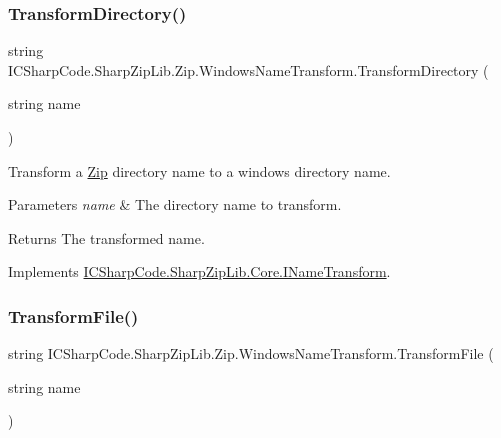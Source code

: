 \subsubsection{\texorpdfstring{Transform\+Directory()}{TransformDirectory()}}
{\footnotesize\ttfamily string I\+C\+Sharp\+Code.\+Sharp\+Zip\+Lib.\+Zip.\+Windows\+Name\+Transform.\+Transform\+Directory (\begin{DoxyParamCaption}\item[{string}]{name }\end{DoxyParamCaption})\hspace{0.3cm}{\ttfamily [inline]}}



Transform a \hyperlink{namespace_i_c_sharp_code_1_1_sharp_zip_lib_1_1_zip}{Zip} directory name to a windows directory name. 


\begin{DoxyParams}{Parameters}
{\em name} & The directory name to transform.\\
\hline
\end{DoxyParams}
\begin{DoxyReturn}{Returns}
The transformed name.
\end{DoxyReturn}


Implements \hyperlink{interface_i_c_sharp_code_1_1_sharp_zip_lib_1_1_core_1_1_i_name_transform_a8052780160a8d458799e014aa8308c78}{I\+C\+Sharp\+Code.\+Sharp\+Zip\+Lib.\+Core.\+I\+Name\+Transform}.

\mbox{\label{class_i_c_sharp_code_1_1_sharp_zip_lib_1_1_zip_1_1_windows_name_transform_aab54d8254c71fcc7b07551a60551e11a}} 
\subsubsection{\texorpdfstring{Transform\+File()}{TransformFile()}}
{\footnotesize\ttfamily string I\+C\+Sharp\+Code.\+Sharp\+Zip\+Lib.\+Zip.\+Windows\+Name\+Transform.\+Transform\+File (\begin{DoxyParamCaption}\item[{string}]{name }\end{DoxyParamCaption})\hspace{0.3cm}{\ttfamily [inline]}}



